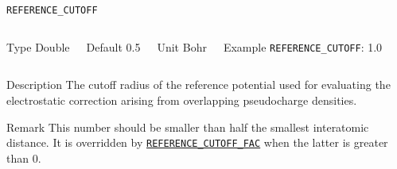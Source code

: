 \begin{frame}[allowframebreaks]{\texttt{REFERENCE\_CUTOFF}} \label{REFERENCE_CUTOFF}
\vspace*{-12pt}
\begin{columns}
\begin{block}{Type}
Double
\end{block}

\begin{block}{Default}
0.5
\end{block}

\begin{block}{Unit}
Bohr
\end{block}

\begin{block}{Example}
\texttt{REFERENCE\_CUTOFF}: 1.0
\end{block}
\end{columns}

\begin{block}{Description}
The cutoff radius of the reference potential used for evaluating the electrostatic correction arising from overlapping pseudocharge densities.
\end{block}

\begin{block}{Remark}
This number should be smaller than half the smallest interatomic distance. It is overridden by \hyperlink{REFERENCE_CUTOFF_FAC}{\texttt{REFERENCE\_CUTOFF\_FAC}} when the latter is greater than 0.
\end{block}

\end{frame}




